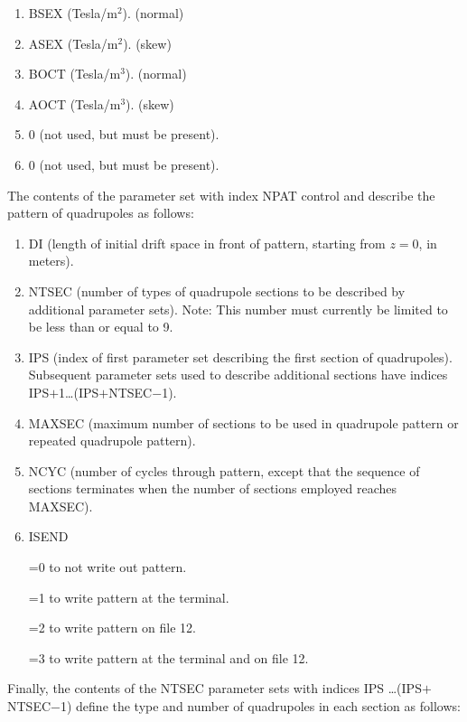 \begin{enumerate}
  \item  BSEX (Tesla/$\mbox{m}^2$). \hspace{1em} (normal)
  \item  ASEX (Tesla/$\mbox{m}^2$). \hspace{1em} (skew)
  \item  BOCT (Tesla/$\mbox{m}^3$). \hspace{1em} (normal)
  \item  AOCT (Tesla/$\mbox{m}^3$). \hspace{1em} (skew)
  \item  0 (not used, but must be present).
  \item  0 (not used, but must be present).
\end{enumerate}
The contents of the parameter set with index NPAT control and describe the pattern of quadrupoles as follows:
\begin{enumerate}
  \item  DI (length of initial drift space in front of pattern, starting from $z=0$, in meters).
  \item  NTSEC (number of types of quadrupole sections to be described by additional parameter sets).  Note:  This number must currently be limited to be less than or equal to 9.
  \item  IPS (index of first parameter set describing the first section of quadrupoles).  \linebreak Subsequent parameter sets used to describe additional sections have indices \linebreak IPS$+$1\ldots (IPS$+$NTSEC$-$1).
  \item  MAXSEC (maximum number of sections to be used in quadrupole pattern or repeated quadrupole pattern).
  \item  NCYC (number of cycles through pattern, except that the sequence of sections terminates when the number of sections employed reaches MAXSEC).
  \item  ISEND

         =0 to not write out pattern.

         =1 to write pattern at the terminal.

         =2 to write pattern on file 12.

         =3 to write pattern at the terminal and on file 12.
\end{enumerate}
Finally, the contents of the NTSEC parameter sets with indices \linebreak IPS \ldots (IPS$+$NTSEC$-$1) define the type and number of quadrupoles in each section as follows:
